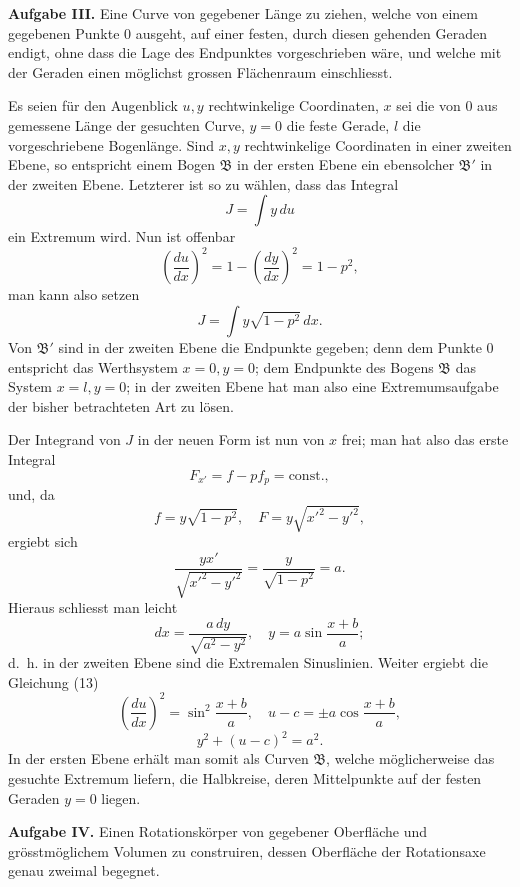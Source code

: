 \documentclass[11pt,a4paper,leqno]{article}
\begin{document}
\medskip
\noindent\textbf{Aufgabe III.} Eine Curve von gegebener Länge zu ziehen, welche von einem gegebenen Punkte 0 ausgeht, auf einer festen, durch diesen gehenden Geraden endigt, ohne dass die Lage des Endpunktes vorgeschrieben wäre, und welche mit der Geraden einen möglichst grossen Flächenraum einschliesst.

Es seien für den Augenblick $u,y$ rechtwinkelige Coordinaten, $x$ sei die von 0 aus gemessene Länge der gesuchten Curve, $y=0$ die feste Gerade, $l$ die vorgeschriebene Bogenlänge. Sind $x,y$ rechtwinkelige Coordinaten in einer zweiten Ebene, so entspricht einem Bogen $\mathfrak{B}$ in der ersten Ebene ein ebensolcher $\mathfrak{B}'$ in der zweiten Ebene. Letzterer ist so zu wählen, dass das Integral
\[
J=\int y\,du
\]
ein Extremum wird. Nun ist offenbar
\begin{equation}\tag{13}
\left(\frac{du}{dx}\right)^2=1-\left(\frac{dy}{dx}\right)^2=1-p^2,
\end{equation}
man kann also setzen
\[
J=\int y\sqrt{1-p^2}\,dx.
\]
Von $\mathfrak{B}'$ sind in der zweiten Ebene die Endpunkte gegeben; denn dem Punkte 0 entspricht das Werthsystem $x=0,y=0$; dem Endpunkte des Bogens $\mathfrak{B}$ das System $x=l,y=0$; in der zweiten Ebene hat man also eine Extremumsaufgabe der bisher betrachteten Art zu lösen.

Der Integrand von $J$ in der neuen Form ist nun von $x$ frei; man hat also das erste Integral
\[
F_{x'}=f-pf_p=\mathrm{const.},
\]
und, da
\[
f=y\sqrt{1-p^2},\quad F=y\sqrt{x'^2-y'^2},
\]
ergiebt sich
\[
\frac{yx'}{\sqrt{x'^2-y'^2}}=\frac{y}{\sqrt{1-p^2}}=a.
\]
Hieraus schliesst man leicht
\[
dx=\frac{a\,dy}{\sqrt{a^2-y^2}},\quad y=a\sin\frac{x+b}{a};
\]
d.~h. in der zweiten Ebene sind die Extremalen Sinuslinien. Weiter ergiebt die Gleichung (13)
\[
\left(\frac{du}{dx}\right)^2=\sin^2\frac{x+b}{a},\quad u-c=\pm a\cos\frac{x+b}{a},
\]
\[
y^2+(u-c)^2=a^2.
\]
In der ersten Ebene erhält man somit als Curven $\mathfrak{B}$, welche möglicherweise das gesuchte Extremum liefern, die Halbkreise, deren Mittelpunkte auf der festen Geraden $y=0$ liegen.

\medskip
\noindent\textbf{Aufgabe IV.} Einen Rotationskörper von gegebener Oberfläche und grösstmöglichem Volumen zu construiren, dessen Oberfläche der Rotationsaxe genau zweimal begegnet.
\end{document}
